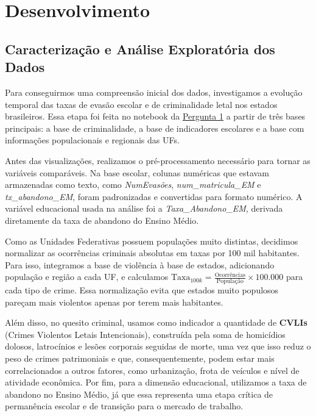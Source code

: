 \documentclass[10pt]{article}
\begin{document}
\section{Desenvolvimento}

\subsection{Caracterização e Análise Exploratória dos Dados}
Para conseguirmos uma compreensão inicial dos dados, investigamos a evolução temporal das taxas de evasão escolar e de criminalidade letal nos estados brasileiros. Essa etapa foi feita no notebook da \href{https://colab.research.google.com/drive/1gWR-Wj-QZPGLsuCqgsbyVTQBU4gDUAzb}{Pergunta 1} a partir de três bases principais: a base de criminalidade, a base de indicadores escolares e a base com informações populacionais e regionais das UFs.

Antes das visualizações, realizamos o pré-processamento necessário para tornar as variáveis comparáveis. Na base escolar, colunas numéricas que estavam armazenadas como texto, como \textit{NumEvasões}, \textit{num\_matricula\_EM} e \textit{tx\_abandono\_EM}, foram padronizadas e convertidas para formato numérico. A variável educacional usada na análise foi a \textit{Taxa\_Abandono\_EM}, derivada diretamente da taxa de abandono do Ensino Médio.

Como as Unidades Federativas possuem populações muito distintas, decidimos normalizar as ocorrências criminais absolutas em taxas por 100 mil habitantes. Para isso, integramos a base de violência à base de estados, adicionando população e região a cada UF, e calculamos $\text{Taxa}_{100k} = \frac{\text{Ocorrências}}{\text{População}} \times 100.000$ para cada tipo de crime. Essa normalização evita que estados muito populosos pareçam mais violentos apenas por terem mais habitantes.

Além disso, no quesito criminal, usamos como indicador a quantidade de \textbf{CVLIs} (Crimes Violentos Letais Intencionais), construída pela soma de homicídios dolosos, latrocínios e lesões corporais seguidas de morte, uma vez que isso reduz o peso de crimes patrimoniais e que, consequentemente, podem estar mais correlacionados a outros fatores, como urbanização, frota de veículos e nível de atividade econômica. Por fim, para a dimensão educacional, utilizamos a taxa de abandono no Ensino Médio, já que essa representa uma etapa crítica de permanência escolar e de transição para o mercado de trabalho.
\end{document}
